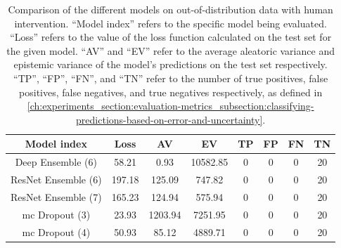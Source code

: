 \begin{table}[H]
    \centering
    \begin{tabular}{c !{\vrule width 2pt} c|c|c|c|c|c|c}
        \textbf{Model index} & \textbf{Loss} & \textbf{AV} & \textbf{EV} & \textbf{TP} & \textbf{FP} & \textbf{FN} & \textbf{TN} \\
        \hline
        Deep Ensemble (6) & 58.21 & 0.93 & 10582.85 & 0 & 0 & 0 & 20 \\
        ResNet Ensemble (6) & 197.18 & 125.09 & 747.82 & 0 & 0 & 0 & 20 \\
        ResNet Ensemble (7) & 165.23 & 124.94 & 575.94 & 0 & 0 & 0 & 20 \\
        \gls{mc} Dropout (3) & 23.93 & 1203.94 & 7251.95 & 0 & 0 & 0 & 20 \\
        \gls{mc} Dropout (4) & 50.93 & 85.12 & 4889.71 & 0 & 0 & 0 & 20 \\
    \end{tabular}
    \caption[Comparison of the different models on out-of-distribution data with human intervention.]{
        Comparison of the different models on out-of-distribution data with human intervention.
        ``Model index'' refers to the specific model being evaluated.
        ``Loss'' refers to the value of the loss function calculated on the test set for the given model.
        ``AV'' and ``EV'' refer to the average aleatoric variance and epistemic variance of the model's predictions on the test set respectively.
        ``TP'', ``FP'', ``FN'', and ``TN'' refer to the number of true positives, false positives, false negatives, and true negatives respectively, as defined in \cref{ch:experiments_section:evaluation-metrics_subsection:classifying-predictions-based-on-error-and-uncertainty}.
        }
    \label{tab:models_comparison_out-of-distribution-human-intervention}
\end{table}

